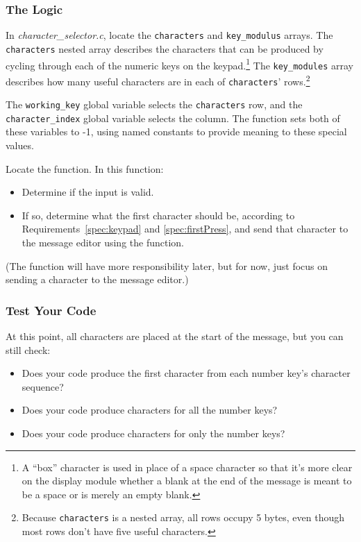 \subsubsection{The Logic} \label{subsubsec:logic}

In \textit{character\_selector.c}, locate the \lstinline{characters} and \lstinline{key_modulus} arrays.
The \lstinline{characters} nested array describes the characters that can be produced by cycling through each of the numeric keys on the keypad.\footnote{
    A ``box'' character is used in place of a space character so that it's more clear on the display module whether a blank at the end of the message is meant to be a space or is merely an empty blank.
}
The \lstinline{key_modules} array describes how many useful characters are in each of \lstinline{characters}' rows.\footnote{
    Because \lstinline{characters} is a nested array, all rows occupy 5 bytes, even though most rows don't have five useful characters.
}

The \lstinline{working_key} global variable selects the \lstinline{characters} row, and the \lstinline{character_index} global variable selects the column.
The  function sets both of these variables to -1, using named constants to provide meaning to these special values.

Locate the  function.
In this function:
\begin{itemize}
    \item Determine if the input is valid.
    \item If so, determine what the first character should be, according to Requirements~\ref{spec:keypad} and \ref{spec:firstPress},
        and send that character to the message editor using the  function.
\end{itemize}
(The  function will have more responsibility later,
but for now, just focus on sending a character to the message editor.)

\subsubsection{Test Your Code}

At this point, all characters are placed at the start of the message, but you can still check:
\begin{itemize}
    \item Does your code produce the first character from each number key's character sequence?
    \item Does your code produce characters for all the number keys?
    \item Does your code produce characters for only the number keys?
\end{itemize}


